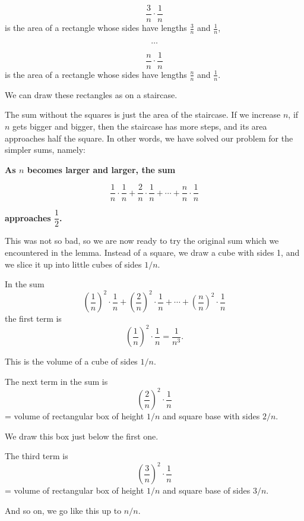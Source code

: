 \documentclass[12pt]{book} %
\begin{document}
\[
\frac3n\cdot\frac1n
\]
is the area of a rectangle whose sides have lengths $\frac3n$ and $\frac1n$,

\[
\dots
\]

\[
\frac{n}{n}\cdot\frac1n
\]
is the area of a rectangle whose sides have lengths $\frac{n}{n}$ and $\frac1n$.

We can draw these rectangles as on a staircase.


The sum without the squares is just the area of the staircase. If we increase $n$, if $n$ gets bigger and bigger, then the staircase has more steps, and its area approaches half the square. In other words, we have solved our problem for the simpler sums, namely:

\begin{center}
\textbf{As $n$ becomes larger and larger, the sum}
\end{center}
\[
\frac1n\cdot\frac1n+\frac2n\cdot\frac1n+\cdots+\frac{n}{n}\cdot\frac1n
\]
\begin{center}
\textbf{approaches $\dfrac12$.}
\end{center}

This was not so bad, so we are now ready to try the original sum which we encountered in the lemma. Instead of a square, we draw a cube with sides 1, and we slice it up into little cubes of sides $1/n$.


In the sum
\[
\left(\frac1n\right)^2\cdot\frac1n
+\left(\frac2n\right)^2\cdot\frac1n
+\cdots
+\left(\frac{n}{n}\right)^2\cdot\frac1n
\]
the first term is
\[
\left(\frac1n\right)^2\cdot\frac1n=\frac1{n^3}.
\]

This is the volume of a cube of sides $1/n$.


The next term in the sum is
\[
\left(\frac2n\right)^2\cdot\frac1n
\]
= volume of rectangular box of height $1/n$ and square base with sides $2/n$.

We draw this box just below the first one.


The third term is
\[
\left(\frac3n\right)^2\cdot\frac1n
\]
= volume of rectangular box of height $1/n$ and square base of sides $3/n$.

And so on, we go like this up to $n/n$.

\end{document}
